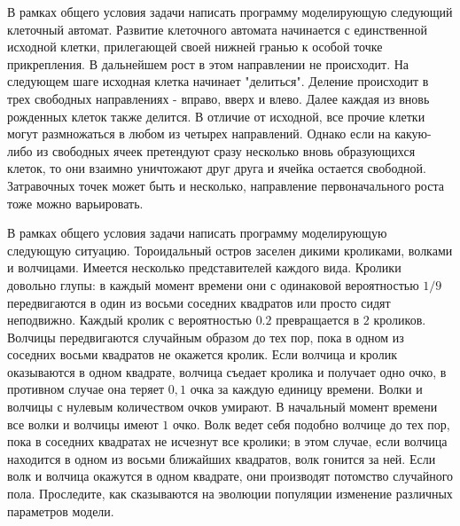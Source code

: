 \begin{zztask}[Лист]
В рамках общего условия задачи написать программу моделирующую следующий 
клеточный автомат.
Развитие клеточного автомата начинается с единственной исходной клетки, 
прилегающей своей нижней гранью к особой точке прикрепления. В дальнейшем 
рост в этом направлении не происходит. На следующем шаге исходная клетка 
начинает "делиться". Деление происходит в трех свободных направлениях - 
вправо, вверх и влево. Далее каждая из вновь рожденных клеток также делится. 
В отличие от исходной, все прочие клетки могут размножаться в любом из 
четырех направлений. Однако если на какую-либо из свободных ячеек претендуют 
сразу несколько вновь образующихся клеток, то они взаимно уничтожают друг 
друга и ячейка остается свободной. Затравочных точек может быть и несколько, 
направление первоначального роста тоже можно варьировать.
\end{zztask}

\begin{zztask}
В рамках общего условия задачи написать программу моделирующую следующую 
ситуацию.
Тороидальный остров заселен дикими кроликами, волками и волчицами.
Имеется несколько представителей каждого вида. Кролики довольно глупы: 
в каждый момент времени они с одинаковой вероятностью $1/9$ передвигаются 
в один из восьми соседних квадратов или просто сидят неподвижно. Каждый кролик 
с вероятностью $0.2$ превращается в $2$ кроликов. Волчицы передвигаются 
случайным образом до тех пор, пока в одном из соседних восьми квадратов 
не окажется кролик. Если волчица и кролик оказываются в одном квадрате, 
волчица съедает кролика и получает одно очко, в противном случае она 
теряет $0,1$ очка за каждую единицу времени. Волки и волчицы с нулевым 
количеством очков умирают. В начальный момент времени все волки и волчицы 
имеют $1$ очко. Волк ведет себя подобно волчице до тех пор, пока в соседних 
квадратах не исчезнут все кролики; в этом случае, если волчица находится 
в одном из восьми ближайших квадратов, волк гонится за ней. Если волк и 
волчица окажутся в одном квадрате, они производят потомство случайного 
пола. Проследите, как сказываются на эволюции популяции изменение различных 
параметров модели. 
\end{zztask}

